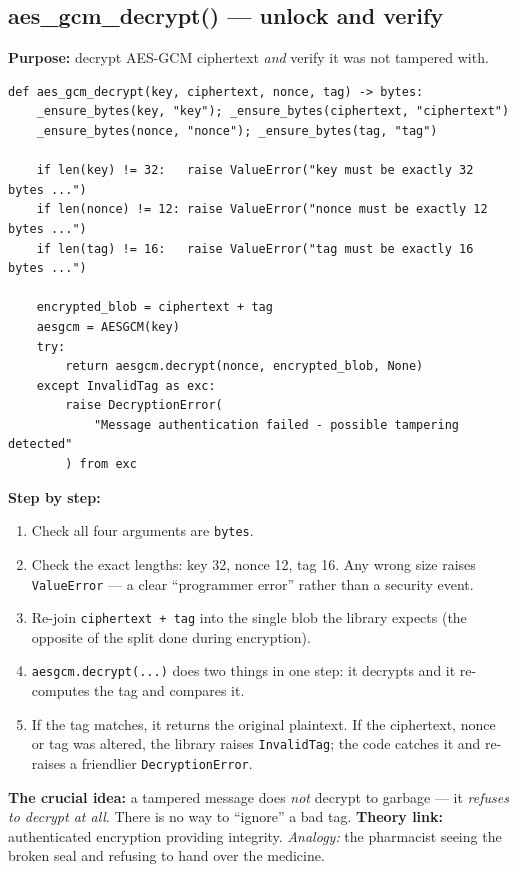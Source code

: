 \documentclass[11pt,a4paper]{article}
\begin{document}
\subsection{aes\_gcm\_decrypt() --- unlock and verify}
\textbf{Purpose:} decrypt AES-GCM ciphertext \emph{and} verify it was not
tampered with.
\begin{lstlisting}[style=py,caption={crypto.py --- AES-256-GCM decryption with tamper detection.}]
def aes_gcm_decrypt(key, ciphertext, nonce, tag) -> bytes:
    _ensure_bytes(key, "key"); _ensure_bytes(ciphertext, "ciphertext")
    _ensure_bytes(nonce, "nonce"); _ensure_bytes(tag, "tag")

    if len(key) != 32:   raise ValueError("key must be exactly 32 bytes ...")
    if len(nonce) != 12: raise ValueError("nonce must be exactly 12 bytes ...")
    if len(tag) != 16:   raise ValueError("tag must be exactly 16 bytes ...")

    encrypted_blob = ciphertext + tag
    aesgcm = AESGCM(key)
    try:
        return aesgcm.decrypt(nonce, encrypted_blob, None)
    except InvalidTag as exc:
        raise DecryptionError(
            "Message authentication failed - possible tampering detected"
        ) from exc
\end{lstlisting}
\textbf{Step by step:}
\begin{enumerate}
  \item Check all four arguments are \texttt{bytes}.
  \item Check the exact lengths: key 32, nonce 12, tag 16. Any wrong size raises
        \texttt{ValueError} --- a clear ``programmer error'' rather than a
        security event.
  \item Re-join \texttt{ciphertext + tag} into the single blob the library
        expects (the opposite of the split done during encryption).
  \item \texttt{aesgcm.decrypt(...)} does two things in one step: it decrypts and
        it re-computes the tag and compares it.
  \item If the tag matches, it returns the original plaintext. If the ciphertext,
        nonce or tag was altered, the library raises \texttt{InvalidTag}; the
        code catches it and re-raises a friendlier \texttt{DecryptionError}.
\end{enumerate}
\textbf{The crucial idea:} a tampered message does \emph{not} decrypt to garbage
--- it \emph{refuses to decrypt at all}. There is no way to ``ignore'' a bad tag.
\textbf{Theory link:} authenticated encryption providing integrity.
\emph{Analogy:} the pharmacist seeing the broken seal and refusing to hand over
the medicine.
\end{document}
